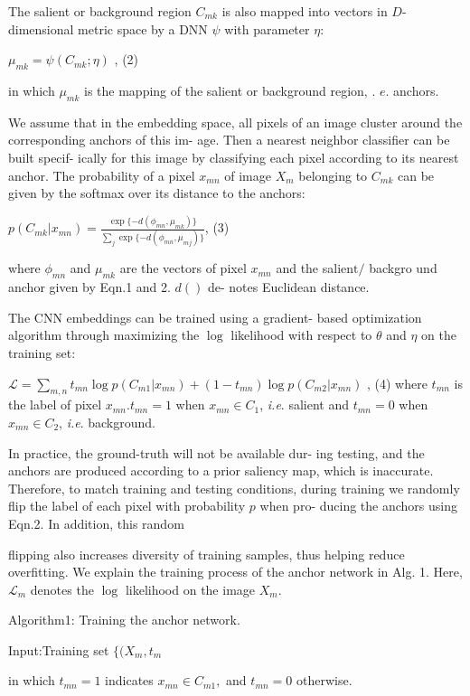 \documentclass[a4paper,10pt]{article}
\begin{document}
The salient or background region $C_{mk}$ is also mapped into vectors in $D$-dimensional metric space by a DNN $\psi$ with parameter $\eta$:
\begin{center}
$\mu_{mk}=\psi(C_{mk};\eta)$ ,   (2)
\end{center}
in which $\mu_{mk}$ is the mapping of the salient or background region, . $e$. anchors.

We assume that in the embedding space, all pixels of an image cluster around the corresponding anchors of this im- age. Then a nearest neighbor classifier can be built specif- ically for this image by classifying each pixel according to its nearest anchor. The probability of a pixel $x_{mn}$ of image $X_{m}$ belonging to $C_{mk}$ can be given by the softmax over its distance to the anchors:
\begin{center}
$p(C_{mk}|x_{mn})=\displaystyle \frac{\exp\{-d(\phi_{mn},\mu_{mk})\}}{\sum_{j}\exp\{-d(\phi_{mn},\mu_{mj})\}}$,   (3)
\end{center}
where $\phi_{mn}$ and $\mu_{mk}$ are the vectors of pixel $x_{mn}$ and the salien$\mathrm{t}/$ backgro und anchor given by Eqn.1 and 2. $d()$ de- notes Euclidean distance.

The CNN embeddings can be trained using a gradient- based optimization algorithm through maximizing the $\log$ likelihood with respect to $\theta$ and $\eta$ on the training set:

$\displaystyle \mathcal{L}=\sum_{m,n}t_{mn}\log p(C_{m1}|x_{mn})+(1-t_{mn})\log p(C_{m2}|x_{mn})$ , (4) where $t_{mn}$ is the label of pixel $x_{mn}. t_{mn}=1$ when $x_{mn}\in C_{1}$, {\it i.e}. salient and $t_{mn}=0$ when $x_{mn}\in C_{2}$, {\it i.e}. background.

In practice, the ground-truth will not be available dur- ing testing, and the anchors are produced according to a prior saliency map, which is inaccurate. Therefore, to match training and testing conditions, during training we randomly flip the label of each pixel with probability $p$ when pro- ducing the anchors using Eqn.2. In addition, this random

flipping also increases diversity of training samples, thus helping reduce overfitting. We explain the training process of the anchor network in Alg. 1. Here, $\mathcal{L}_{m}$ denotes the $\log$ likelihood on the image $X_{m}.$

Algorithm1: Training the anchor network.

Input:Training set $\{(X_{m}, t_{m}$

in which $t_{mn}=1$ indicates $x_{mn}\in C_{m1},$ and $t_{mn}=0$ otherwise.
\end{document}
